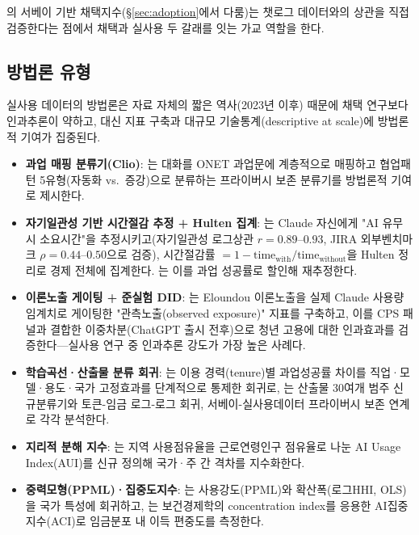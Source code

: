 \documentclass[11pt]{article}
\begin{document}
\citet{bick-2026-what-work-does-generative}의 서베이 기반 채택지수(\S\ref{sec:adoption}에서 다룸)는 챗로그 데이터와의 상관을 직접 검증한다는 점에서 채택과 실사용 두 갈래를 잇는 가교 역할을 한다.

\subsection{방법론 유형}

실사용 데이터의 방법론은 자료 자체의 짧은 역사(2023년 이후) 때문에 채택 연구보다 인과추론이 약하고, 대신 지표 구축과 대규모 기술통계(descriptive at scale)에 방법론적 기여가 집중된다.

\begin{itemize}[leftmargin=*]
  \item \textbf{과업 매핑 분류기(Clio)}: \citet{handa-2025-which-economic-tasks-are}는 대화를 O\*NET 과업문에 계층적으로 매핑하고 협업패턴 5유형(자동화 vs.\ 증강)으로 분류하는 프라이버시 보존 분류기를 방법론적 기여로 제시한다.
  \item \textbf{자기일관성 기반 시간절감 추정 + Hulten 집계}: \citet{tamkin-2025-estimating-ai-productivity-gains-from}는 Claude 자신에게 "AI 유무 시 소요시간"을 추정시키고(자기일관성 로그상관 $r=0.89$--$0.93$, JIRA 외부벤치마크 $\rho=0.44$--$0.50$으로 검증), 시간절감률 $=1-\text{time}_{\text{with}}/\text{time}_{\text{without}}$을 Hulten 정리로 경제 전체에 집계한다. \citet{appel-2026-economic-primitives}는 이를 과업 성공률로 할인해 재추정한다.
  \item \textbf{이론노출 게이팅 + 준실험 DID}: \citet{massenkoff-2026-labor-market-impacts-of-ai}는 Eloundou 이론노출을 실제 Claude 사용량 임계치로 게이팅한 "관측노출(observed exposure)" 지표를 구축하고, 이를 CPS 패널과 결합한 이중차분(ChatGPT 출시 전후)으로 청년 고용에 대한 인과효과를 검증한다—실사용 연구 중 인과추론 강도가 가장 높은 사례다.
  \item \textbf{학습곡선·산출물 분류 회귀}: \citet{massenkoff-2026-learning-curves}는 이용 경력(tenure)별 과업성공률 차이를 직업·모델·용도·국가 고정효과를 단계적으로 통제한 회귀로, \citet{massenkoff-2026-cadences}는 산출물 30여개 범주 신규분류기와 토큰-임금 로그-로그 회귀, 서베이-실사용데이터 프라이버시 보존 연계로 각각 분석한다.
  \item \textbf{지리적 분해 지수}: \citet{appel-2025-uneven-geographic-and-enterprise-ai}는 지역 사용점유율을 근로연령인구 점유율로 나눈 AI Usage Index(AUI)를 신규 정의해 국가·주 간 격차를 지수화한다.
  \item \textbf{중력모형(PPML)·집중도지수}: \citet{fan-2026-what-countries-use-ai-and}는 사용강도(PPML)와 확산폭(로그HHI, OLS)을 국가 특성에 회귀하고, \citet{fan-2026-aggregate-gains-from-ai}는 보건경제학의 concentration index를 응용한 AI집중지수(ACI)로 임금분포 내 이득 편중도를 측정한다.

\end{itemize}
\end{document}
